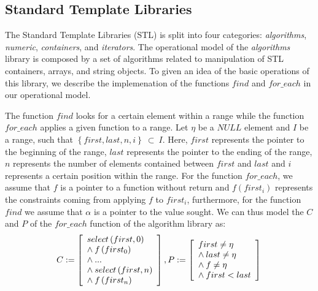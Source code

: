 \documentclass[a4paper]{llncs}
\begin{document}
\subsection{Standard Template Libraries}

The Standard Template Libraries (STL) is split into
four categories: \textit{algorithms}, \textit{numeric},
\textit{containers}, and \textit{iterators}. The operational model
of the \textit{algorithms} library is composed by a set of algorithms
related to manipulation of STL containers, arrays, and string objects.
To given an idea of the basic operations of this library, we describe
the implemenation of the functions $find$ and $for\_each$ in our
operational model.

The function $find$ looks for a certain element within a range while the
function $for\_each$ applies a given function to a range. Let $\eta$ be
a $NULL$ element and $I$ be a range, such that $\left\{first, last, n, i\right\}\:\subset\:I$.
Here, $first$ represents the pointer to the beginning of the range, $last$ represents
the pointer to the ending of the range, $n$ represents the number of elements
contained between $first$ and $last$ and $i$ represents a certain position
within the range. For the function $for\_each$, we assume that $f$ is a pointer to a function without
return and $f\left(first_{i}\right)$ represents the constraints coming from applying $f$ to $first_{i}$, furthermore,
for the function $find$ we assume that $\alpha$ is a pointer to the value sought.
We can thus model the $C$ and $P$ of the $for\_each$ function  of the algorithm library as:
%
\begin{equation}
\label{quantifier-free-formulae-for-each}
C := \left [ \begin{array}{ll}
            select\left(first, 0\right) \\
            \wedge \:f\left(first_{0}\right)\\
            \wedge \:... \\
            \wedge \:select\left(first, n\right) \\
            \wedge \:f\left(first_{n}\right) \\
              \end{array} \right ], \\
P := \left [ \begin{array}{ll}
            first \neq \eta \\
	    \wedge \:last \neq \eta \\
	    \wedge \:f \neq \eta \\
	    \wedge \:first < last \\
              \end{array} \right ]  \\
\end{equation}
\end{document}
